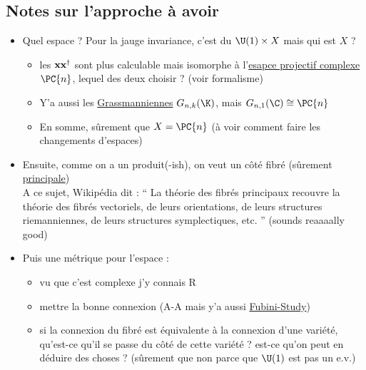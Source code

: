\subsection{Notes sur l'approche à avoir}\label{subsec:phaseG_variete}

\begin{itemize}
	\item Quel espace ? Pour la jauge invariance, c'est du $\U(1)\times X$ mais qui est $X$ ? 
	\begin{itemize}
		\item les $\bf{x}\bf{x}^\dagger$ sont plus calculable mais isomorphe à l'\href{https://en.wikipedia.org/wiki/Complex_projective_space#Differential_geometry}{esapce projectif complexe} $\PC{n}$, lequel des deux choisir ? (voir formalisme)
		
		\item Y'a aussi les \href{https://fr.wikipedia.org/wiki/Grassmannienne}{Grassmanniennes} $G_{n,k}(\K)$, mais $G_{n, 1}(\C)\cong \PC{n}$
		
		\item En somme, sûrement que $X=\PC{n}$ (à voir comment faire les changements d'espaces)
		
	\end{itemize}
	
	\item Ensuite, comme on a un produit(-ish), on veut un côté fibré (sûrement \href{https://fr.wikipedia.org/wiki/Fibr%C3%A9_principal}{principale}) \\
	A ce sujet, Wikipédia dit : `` La théorie des fibrés principaux recouvre la théorie des fibrés vectoriels, de leurs orientations, de leurs structures riemanniennes, de leurs structures symplectiques, etc. '' (sounds reaaaally good)
	
	\item Puis une métrique pour l'espace :
	\begin{itemize}
		
		\item vu que c'est complexe j'y connais R
		
		\item mettre la bonne connexion (A-A mais y'a aussi  \href{https://en.wikipedia.org/wiki/Fubini%E2%80%93Study_metric}{Fubini-Study})
		
		\item si la connexion du fibré est équivalente à la connexion d'une variété, qu'est-ce qu'il se passe du côté de cette variété ? est-ce qu'on peut en déduire des choses ? (sûrement que non parce que $\U(1)$ est pas un e.v.)
	\end{itemize} 
	

\end{itemize}
